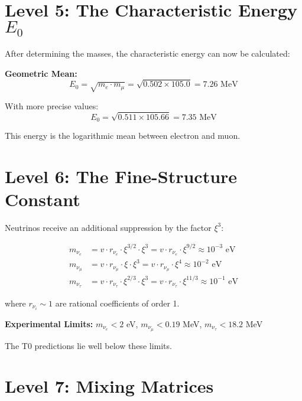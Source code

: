 \documentclass[12pt,a4paper]{article}
\newcommand{\xipar}{\xi}
\newcommand{\Ezero}{E_0}
\begin{document}
	\section{Level 5: The Characteristic Energy $E_0$}
	
	\begin{derived}
		After determining the masses, the characteristic energy can now be calculated:
		
		\textbf{Geometric Mean:}
		\begin{equation}
			\Ezero = \sqrt{m_e \cdot m_\mu} = \sqrt{0.502 \times 105.0} = 7.26 \text{ MeV}
		\end{equation}
		
		With more precise values:
		\begin{equation}
			\Ezero = \sqrt{0.511 \times 105.66} = 7.35 \text{ MeV}
		\end{equation}
		
		This energy is the logarithmic mean between electron and muon.
	\end{derived}
	
	\section{Level 6: The Fine-Structure Constant}
	
	\begin{derived}
		Neutrinos receive an additional suppression by the factor $\xipar^3$:
		
		\begin{align}
			m_{\nu_e} &= v \cdot r_{\nu_e} \cdot \xipar^{3/2} \cdot \xipar^3 = v \cdot r_{\nu_e} \cdot \xipar^{9/2} \approx 10^{-3} \text{ eV} \\
			m_{\nu_\mu} &= v \cdot r_{\nu_\mu} \cdot \xipar \cdot \xipar^3 = v \cdot r_{\nu_\mu} \cdot \xipar^{4} \approx 10^{-2} \text{ eV} \\
			m_{\nu_\tau} &= v \cdot r_{\nu_\tau} \cdot \xipar^{2/3} \cdot \xipar^3 = v \cdot r_{\nu_\tau} \cdot \xipar^{11/3} \approx 10^{-1} \text{ eV}
		\end{align}
		
		where $r_{\nu_i} \sim 1$ are rational coefficients of order 1.
		
		\textbf{Experimental Limits:} $m_{\nu_e} < 2$ eV, $m_{\nu_\mu} < 0.19$ MeV, $m_{\nu_\tau} < 18.2$ MeV
		
		The T0 predictions lie well below these limits.
	\end{derived}
	
	\section{Level 7: Mixing Matrices}
	
\end{document}
